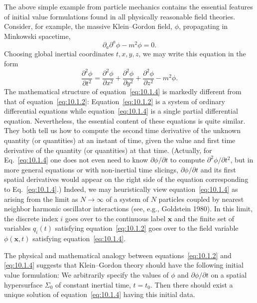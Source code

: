 The above simple example from particle mechanics contains the essential features of
initial value formulations found in all physically reasonable field theories. Consider,
for example, the massive Klein--Gordon field, \(\phi\), propagating in Minkowski
spacetime,
\begin{equation}
  \partial_a\partial^a\phi-m^2\phi=0.
  \tag{10.1.3}\label{eq:10.1.3}
\end{equation}
Choosing global inertial coordinates \(t,x,y,z\), we may write this equation in the form
\begin{equation}
  \frac{\partial^2\phi}{\partial t^2}
  =\frac{\partial^2\phi}{\partial x^2}
   +\frac{\partial^2\phi}{\partial y^2}
   +\frac{\partial^2\phi}{\partial z^2}-m^2\phi.
  \tag{10.1.4}\label{eq:10.1.4}
\end{equation}
The mathematical structure of equation~\eqref{eq:10.1.4} is markedly different from
that of equation~\eqref{eq:10.1.2}: Equation~\eqref{eq:10.1.2} is a system of
ordinary differential equations while equation~\eqref{eq:10.1.4} is a single partial
differential equation. Nevertheless, the essential content of these equations is quite
similar. They both tell us how to compute the second time derivative of the unknown
quantity (or quantities) at an instant of time, given the value and first time derivative
of the quantity (or quantities) at that time. (Actually, for
Eq.~\eqref{eq:10.1.4} one does not even need to know \(\partial\phi/\partial t\) to
compute \(\partial^2\phi/\partial t^2\), but in more general equations or with
non-inertial time slicings, \(\partial\phi/\partial t\) and its first spatial derivatives
would appear on the right side of the equation corresponding to
Eq.~\eqref{eq:10.1.4}.) Indeed, we may heuristically view
equation~\eqref{eq:10.1.4} as arising from the limit as \(N\to\infty\) of a system
of \(N\) particles coupled by nearest neighbor harmonic oscillator interactions (see,
e.g., Goldstein 1980). In this limit, the discrete index \(i\) goes over to the continuous
label \(\mathbf{x}\) and the finite set of variables \(q_i(t)\) satisfying
equation~\eqref{eq:10.1.2} goes over to the field variable \(\phi(\mathbf{x},t)\)
satisfying equation~\eqref{eq:10.1.4}.

The physical and mathematical analogy between equations~\eqref{eq:10.1.2} and
\eqref{eq:10.1.4} suggests that Klein--Gordon theory should have the following
initial value formulation: We arbitrarily specify the values of \(\phi\) and
\(\partial\phi/\partial t\) on a spatial hypersurface \(\Sigma_0\) of constant inertial
time, \(t=t_0\). Then there should exist a unique solution of
equation~\eqref{eq:10.1.4} having this initial data.


